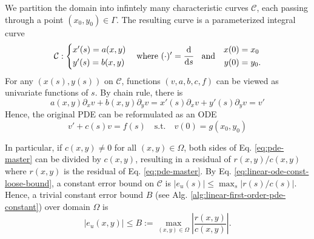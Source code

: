 \documentclass[accepted]{uai2023}
\newcommand{\ds}[1]{\cfrac{\mathrm{d} #1}{\mathrm{d} s}}
\newcommand{\Err}{e}
\begin{document}
    We partition the domain into infintely many characteristic curves $\mathcal{C}$, each passing through a point $(x_0, y_0) \in \Gamma$. The resulting curve is a parameterized integral curve 
    {
        \small
        \begin{equation*} 
            \mathcal{C}: \begin{cases*}
                x'(s) = a(x, y) \\
                y'(s) = b(x, y) 
            \end{cases*} 
            \quad
            \text{where}
            \,\,
            (\cdot)' = \ds{}
            \quad
            \text{and} 
            \quad
            \begin{aligned}
                x(0) &= x_0 \\
                y(0) &= y_0.
            \end{aligned}
        \end{equation*}
    }
    For any $(x(s), y(s))$ on $\mathcal{C}$, functions $(v, a, b, c, f)$ can be viewed as univariate functions of $s$. By chain rule, there is
    {
        \small
        \begin{equation*}
            a(x, y)\partial_x v + b(x, y)\partial_y v = x'(s)\partial_x v  + y'(s)\partial_y v = v'
        \end{equation*}
    }
    Hence, the original PDE can be reformulated as an ODE
    {
        \small
        \begin{equation}
            v' + c(s)v = f(s) \quad \text{s.t.} \quad v(0) = g(x_0, y_0)
        \end{equation}
    }

    In particular, if $c(x, y) \neq 0$ for all $(x, y) \in \Omega$, both sides of Eq. \ref{eq:pde-master} can be divided by $c(x, y)$, resulting in a residual of $r(x, y)/c(x, y)$ where $r(x, y)$ is the residual of Eq. \ref{eq:pde-master}. By Eq. \ref{eq:linear-ode-const-loose-bound}, a constant error bound on $\mathcal{C}$ is $|\Err_u(s)| \leq \max_{s}\left|r(s)/c(s)\right|$. Hence, a trivial constant error bound $B$ (see Alg. \ref{alg:linear-first-order-pde-constant}) over domain $\Omega$ is
    {
        \small
        \begin{equation}
            |\Err_u(x, y)| \leq B :=\max_{(x, y)\in \Omega}\left|\frac{r(x, y)}{c(x, y)}\right|.
        \end{equation}
    }
\end{document}
